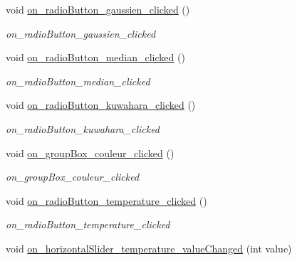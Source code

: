 \begin{DoxyCompactItemize}
void \hyperlink{classAppMainWindow_aee4cb01973a657803e2d24bfb0a882c2}{on\+\_\+radio\+Button\+\_\+gaussien\+\_\+clicked} ()
\begin{DoxyCompactList}\small\item\em on\+\_\+radio\+Button\+\_\+gaussien\+\_\+clicked \end{DoxyCompactList}\item 
\mbox{\label{classAppMainWindow_a8034e487bc2d6f95861fc8b2dd5f46aa}} 
void \hyperlink{classAppMainWindow_a8034e487bc2d6f95861fc8b2dd5f46aa}{on\+\_\+radio\+Button\+\_\+median\+\_\+clicked} ()
\begin{DoxyCompactList}\small\item\em on\+\_\+radio\+Button\+\_\+median\+\_\+clicked \end{DoxyCompactList}\item 
\mbox{\label{classAppMainWindow_a2d5a87a6dc114994d028e72bb26edf3f}} 
void \hyperlink{classAppMainWindow_a2d5a87a6dc114994d028e72bb26edf3f}{on\+\_\+radio\+Button\+\_\+kuwahara\+\_\+clicked} ()
\begin{DoxyCompactList}\small\item\em on\+\_\+radio\+Button\+\_\+kuwahara\+\_\+clicked \end{DoxyCompactList}\item 
\mbox{\label{classAppMainWindow_a56a76ba2077a34598d47c6a937da0599}} 
void \hyperlink{classAppMainWindow_a56a76ba2077a34598d47c6a937da0599}{on\+\_\+group\+Box\+\_\+couleur\+\_\+clicked} ()
\begin{DoxyCompactList}\small\item\em on\+\_\+group\+Box\+\_\+couleur\+\_\+clicked \end{DoxyCompactList}\item 
\mbox{\label{classAppMainWindow_ae23e8ea7cc17d595db0d1b43329b646c}} 
void \hyperlink{classAppMainWindow_ae23e8ea7cc17d595db0d1b43329b646c}{on\+\_\+radio\+Button\+\_\+temperature\+\_\+clicked} ()
\begin{DoxyCompactList}\small\item\em on\+\_\+radio\+Button\+\_\+temperature\+\_\+clicked \end{DoxyCompactList}\item 
void \hyperlink{classAppMainWindow_a500aa992a36991cbc4cd6a1fe39bd2ff}{on\+\_\+horizontal\+Slider\+\_\+temperature\+\_\+value\+Changed} (int value)

\end{DoxyCompactItemize}
